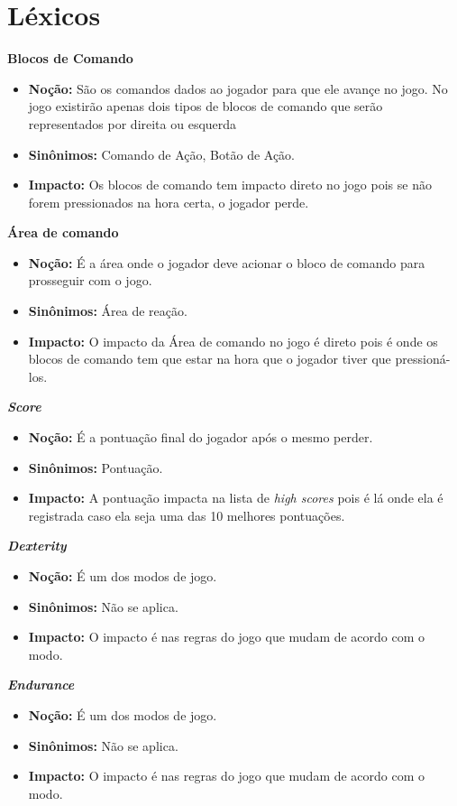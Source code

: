 \section{Léxicos}

\hypertarget{blocoDeComando}{\textbf{Blocos de Comando}}
\begin{itemize}
\item\textbf{Noção:} São os comandos dados ao jogador para que ele avançe no jogo. No jogo existirão apenas dois tipos de blocos de comando que serão representados por direita ou esquerda
\item\textbf{Sinônimos:} Comando de Ação, Botão de Ação.
\item\textbf{Impacto:} Os blocos de comando tem impacto direto no jogo pois se não forem pressionados na hora certa, o jogador perde.
\end{itemize}

\hypertarget{areaDeComando}{\textbf{Área de comando}}
\begin{itemize}
\item\textbf{Noção:} É a área onde o jogador deve acionar o bloco de comando para prosseguir com o jogo.
\item\textbf{Sinônimos:} Área de reação.
\item\textbf{Impacto:} O impacto da Área de comando no jogo é direto pois é onde os blocos de comando tem que estar na hora que o jogador tiver que pressioná-los.
\end{itemize}

\hypertarget{score}{\textbf{\textit{Score}}}
\begin{itemize}
\item\textbf{Noção:} É a pontuação final do jogador após o mesmo perder.
\item\textbf{Sinônimos:} Pontuação.
\item\textbf{Impacto:} A pontuação impacta na lista de \textit{high scores} pois é lá onde ela é registrada caso ela seja uma das 10 melhores pontuações.
\end{itemize}

\hypertarget{dexterity}{\textbf{\textit{Dexterity}}}
\begin{itemize}
\item\textbf{Noção:} É um dos modos de jogo.
\item\textbf{Sinônimos:} Não se aplica.
\item\textbf{Impacto:} O impacto é nas regras do jogo que mudam de acordo com o modo.
\end{itemize}

\hypertarget{endurance}{\textbf{\textit{Endurance}}}
\begin{itemize}
\item\textbf{Noção:} É um dos modos de jogo.
\item\textbf{Sinônimos:} Não se aplica.
\item\textbf{Impacto:} O impacto é nas regras do jogo que mudam de acordo com o modo.
\end{itemize}

